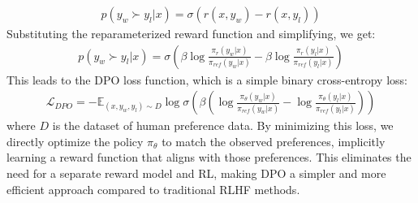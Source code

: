 \begin{align}
p(y_w \succ y_l | x) = \sigma \left( r(x, y_w) - r(x, y_l) \right)
\end{align}
Substituting the reparameterized reward function and simplifying, we get:
\begin{align}
p(y_w \succ y_l | x) = \sigma \left( \beta \log \frac{\pi_r(y_w | x)}{\pi_{ref}(y_w | x)} - \beta \log \frac{\pi_r(y_l | x)}{\pi_{ref}(y_l | x)} \right)
\end{align}
This leads to the DPO loss function, which is a simple binary cross-entropy loss:
\begin{align}
\mathcal{L}_{DPO} = -\mathbb{E}_{(x, y_w, y_l) \sim D} \log \sigma \left( \beta \left( \log \frac{\pi_\theta(y_w | x)}{\pi_{ref}(y_w | x)} - \log \frac{\pi_\theta(y_l | x)}{\pi_{ref}(y_l | x)} \right) \right)
\end{align}
where $D$ is the dataset of human preference data.
By minimizing this loss, we directly optimize the policy $\pi_\theta$ to match the observed preferences, implicitly learning a reward function that aligns with those preferences. This eliminates the need for a separate reward model and RL, making DPO a simpler and more efficient approach compared to traditional RLHF methods.